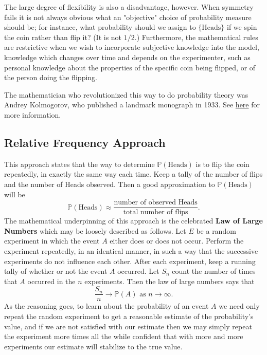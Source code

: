 The large degree of flexibility is also a disadvantage, however. When
symmetry fails it is not always obvious what an "objective" choice
of probability measure should be; for instance, what probability
should we assign to \( \{ \mbox{Heads} \} \) if we spin the coin
rather than flip it? (It is not \(1/2\).) Furthermore, the
mathematical rules are restrictive when we wish to incorporate
subjective knowledge into the model, knowledge which changes over time
and depends on the experimenter, such as personal knowledge about the
properties of the specific coin being flipped, or of the person doing
the flipping.

The mathematician who revolutionized this way to do probability theory
was Andrey Kolmogorov, who published a landmark monograph in 1933. See
\href{http://www-history.mcs.st-andrews.ac.uk/Mathematicians/Kolmogorov.html}{here} for more information.

\subsection{Relative Frequency Approach}
\label{sec-4-3-2}

This approach states that the way to determine
\(\mathbb{P}(\mbox{Heads})\) is to flip the coin repeatedly, in
exactly the same way each time. Keep a tally of the number of flips
and the number of Heads observed. Then a good approximation to
\(\mathbb{P}(\mbox{Heads})\) will be
\begin{equation} 
\mathbb{P}(\mbox{Heads})\approx\frac{\mbox{number of observed Heads}}{\mbox{total number of flips}}.
\end{equation}
The mathematical underpinning of this approach is the celebrated \textbf{Law
of Large Numbers} which may be loosely described as follows. Let \(E\)
be a random experiment in which the event \(A\) either does or does
not occur. Perform the experiment repeatedly, in an identical manner,
in such a way that the successive experiments do not influence each
other. After each experiment, keep a running tally of whether or not
the event \(A\) occurred. Let \(S_{n}\) count the number of times that
\(A\) occurred in the \(n\) experiments. Then the law of large numbers
says that
\begin{equation}
\frac{S_{n}}{n}\to\mathbb{P}(A)\mbox{ as }n\to\infty.
\end{equation}
As the reasoning goes, to learn about the probability of an event
\(A\) we need only repeat the random experiment to get a reasonable
estimate of the probability's value, and if we are not satisfied with
our estimate then we may simply repeat the experiment more times all
the while confident that with more and more experiments our estimate
will stabilize to the true value.

